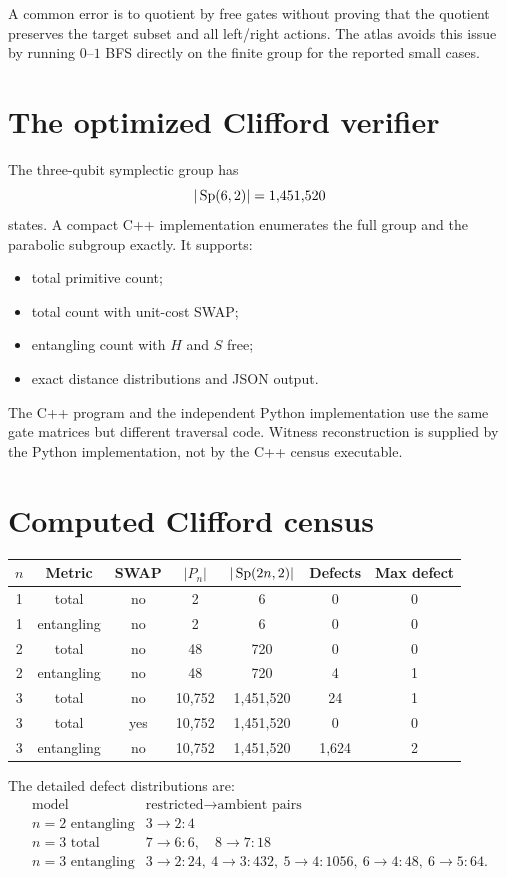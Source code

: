 A common error is to quotient by free gates without proving that the quotient preserves the target subset and all left/right actions.  The atlas avoids this issue by running $0$--$1$ BFS directly on the finite group for the reported small cases.

\section{The optimized Clifford verifier}
The three-qubit symplectic group has
\[
|\operatorname{Sp}(6,2)|=1{,}451{,}520
\]
states.  A compact C++ implementation enumerates the full group and the parabolic subgroup exactly.  It supports:
\begin{itemize}
\item total primitive count;
\item total count with unit-cost SWAP;
\item entangling count with $H$ and $S$ free;
\item exact distance distributions and JSON output.
\end{itemize}
The C++ program and the independent Python implementation use the same gate matrices but different traversal code.  Witness reconstruction is supplied by the Python implementation, not by the C++ census executable.

\section{Computed Clifford census}
\begin{longtable}{@{}ccccccc@{}}
\toprule
$n$ & Metric & SWAP & $|P_n|$ & $|\operatorname{Sp}(2n,2)|$ & Defects & Max defect\\
\midrule
1 & total & no & 2 & 6 & 0 & 0\\
1 & entangling & no & 2 & 6 & 0 & 0\\
2 & total & no & 48 & 720 & 0 & 0\\
2 & entangling & no & 48 & 720 & 4 & 1\\
3 & total & no & 10,752 & 1,451,520 & 24 & 1\\
3 & total & yes & 10,752 & 1,451,520 & 0 & 0\\
3 & entangling & no & 10,752 & 1,451,520 & 1,624 & 2\\
\bottomrule
\end{longtable}

The detailed defect distributions are:
\[
\begin{array}{c|l}
\text{model}&\text{restricted}\to\text{ambient pairs}\\
\hline
n=2\text{ entangling}&3\to2:4\\
n=3\text{ total}&7\to6:6,\quad8\to7:18\\
n=3\text{ entangling}&3\to2:24,\ 4\to3:432,\ 5\to4:1056,\ 6\to4:48,\ 6\to5:64.
\end{array}
\]

